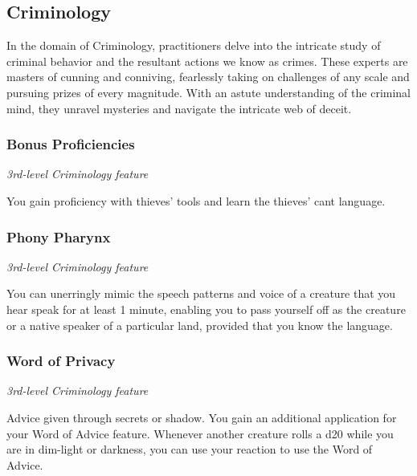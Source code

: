 \documentclass[letterpaper,openany,twoside,twocolumn]{book}
\begin{document}
	\subsection*{Criminology}
	In the domain of Criminology, practitioners delve into the intricate study of criminal behavior and the resultant actions we know as crimes. These experts are masters of cunning and conniving, fearlessly taking on challenges of any scale and pursuing prizes of every magnitude. With an astute understanding of the criminal mind, they unravel mysteries and navigate the intricate web of deceit.
	
	\subsubsection*{Bonus Proficiencies}
	\textnormal{\textit{3rd-level Criminology feature}}
	
	You gain proficiency with thieves’ tools and learn the thieves’ cant language.
	
	\subsubsection*{Phony Pharynx}
	\textnormal{\textit{3rd-level Criminology feature}}
	
	You can unerringly mimic the speech patterns and voice of a creature that you hear speak for at least 1 minute, enabling you to pass yourself off as the creature or a native speaker of a particular land, provided that you know the language.
	
	\subsubsection*{Word of Privacy}
	\textnormal{\textit{3rd-level Criminology feature}}
	
	Advice given through secrets or shadow. You gain an additional application for your Word of Advice feature. Whenever another creature rolls a d20 while you are in dim-light or darkness, you can use your reaction to use the Word of Advice.
	
\end{document}
